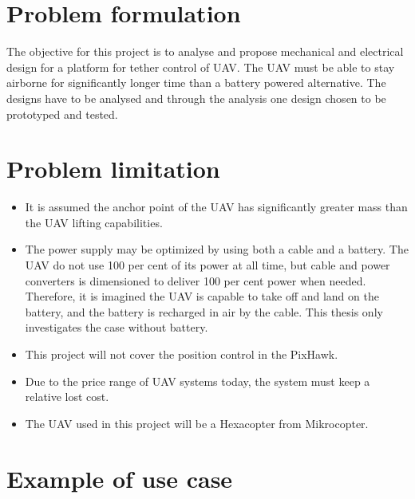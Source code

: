  


\section{Problem formulation} 

The objective for this project is to analyse and propose mechanical and electrical design for a platform for tether control of UAV. The UAV must be able to stay airborne for significantly longer time than a battery powered alternative. The designs have to be analysed and through the analysis one design chosen to be prototyped and tested.

\section{Problem limitation}
\begin{itemize}
\item It is assumed the anchor point of the UAV has significantly greater mass than the UAV lifting capabilities.
\item The power supply may be optimized by using both a cable and a battery. The UAV do not use 100 per cent of its power at all time, but cable and power converters is dimensioned to deliver 100 per cent power when needed. Therefore, it is imagined the UAV is capable to take off and land on the battery, and the battery is recharged in air by the cable. This thesis only investigates the case without battery.
\item This project will not cover the position control in the PixHawk. 
\item Due to the price range of UAV systems today, the system must keep a relative lost cost.
\item The UAV used in this project will be a Hexacopter from Mikrocopter.
\end{itemize}


\section{Example of use case}

